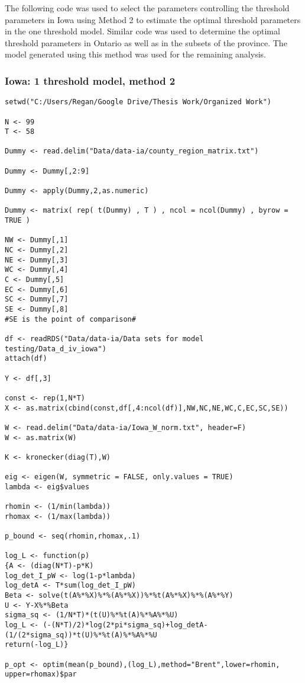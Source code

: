 The following code was used to select the parameters controlling the threshold parameters in Iowa using Method 2 to estimate the optimal threshold parameters in the one threshold model. Similar code was used to determine the optimal threshold parameters in Ontario as well as in the subsets of the province. The model generated using this method was used for the remaining analysis.


\subsubsection{Iowa: 1 threshold model, method 2}

\begin{lstlisting}
setwd("C:/Users/Regan/Google Drive/Thesis Work/Organized Work")

N <- 99
T <- 58

Dummy <- read.delim("Data/data-ia/county_region_matrix.txt")

Dummy <- Dummy[,2:9]

Dummy <- apply(Dummy,2,as.numeric)

Dummy <- matrix( rep( t(Dummy) , T ) , ncol = ncol(Dummy) , byrow = TRUE )

NW <- Dummy[,1]
NC <- Dummy[,2]
NE <- Dummy[,3]
WC <- Dummy[,4]
C <- Dummy[,5]
EC <- Dummy[,6]
SC <- Dummy[,7]
SE <- Dummy[,8]
#SE is the point of comparison#

df <- readRDS("Data/data-ia/Data sets for model testing/Data_d_iv_iowa")
attach(df)

Y <- df[,3]

const <- rep(1,N*T)
X <- as.matrix(cbind(const,df[,4:ncol(df)],NW,NC,NE,WC,C,EC,SC,SE))

W <- read.delim("Data/data-ia/Iowa_W_norm.txt", header=F)
W <- as.matrix(W)

K <- kronecker(diag(T),W)

eig <- eigen(W, symmetric = FALSE, only.values = TRUE)
lambda <- eig$values

rhomin <- (1/min(lambda))
rhomax <- (1/max(lambda))

p_bound <- seq(rhomin,rhomax,.1)

log_L <- function(p)
{A <- (diag(N*T)-p*K)
log_det_I_pW <- log(1-p*lambda)
log_detA <- T*sum(log_det_I_pW)
Beta <- solve(t(A%*%X)%*%(A%*%X))%*%t(A%*%X)%*%(A%*%Y)
U <- Y-X%*%Beta
sigma_sq <- (1/N*T)*(t(U)%*%t(A)%*%A%*%U)
log_L <- (-(N*T)/2)*log(2*pi*sigma_sq)+log_detA-(1/(2*sigma_sq))*t(U)%*%t(A)%*%A%*%U
return(-log_L)}

p_opt <- optim(mean(p_bound),(log_L),method="Brent",lower=rhomin, upper=rhomax)$par


\end{lstlisting}
